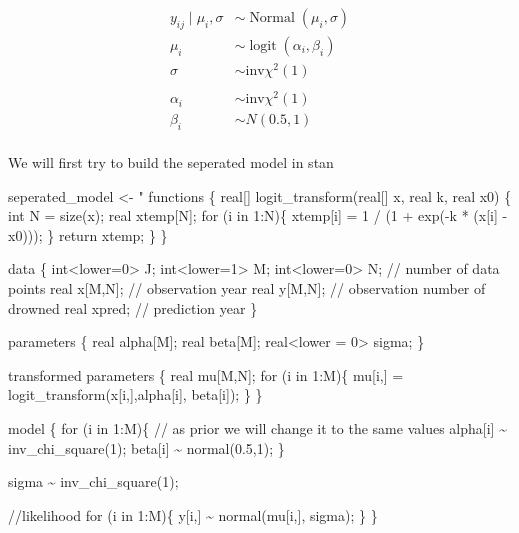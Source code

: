 \documentclass[
]{article}
\newenvironment{Shaded}{\begin{snugshade}}{\end{snugshade}}
\newcommand{\NormalTok}[1]{#1}
\newcommand{\OtherTok}[1]{\textcolor[rgb]{0.56,0.35,0.01}{#1}}
\newcommand{\StringTok}[1]{\textcolor[rgb]{0.31,0.60,0.02}{#1}}
\begin{document}
\[
\begin{aligned}
y_{i j} \mid \mu_i, \sigma &\sim \operatorname{Normal}\left(\mu_i, \sigma\right) \\
\mu_i &\sim \operatorname{logit}(\alpha_i, \beta_i)\\
\sigma &\sim \text{inv}\chi^2(1)\\
\\
\alpha_i &\sim \text{inv}\chi^2(1) \\
\beta_i &\sim N(0.5,1) \\
\end{aligned}
\]

We will first try to build the seperated model in stan

\begin{Shaded}
\begin{Highlighting}[]
\NormalTok{seperated\_model }\OtherTok{\textless{}{-}} \StringTok{"}
\StringTok{functions \{}
\StringTok{  real[] logit\_transform(real[] x, real k, real x0) \{}
\StringTok{    int N = size(x);}
\StringTok{    real xtemp[N];}
\StringTok{    for (i in 1:N)\{}
\StringTok{      xtemp[i] = 1 / (1 + exp({-}k * (x[i] {-} x0)));}
\StringTok{    \}}
\StringTok{     return xtemp;}
\StringTok{  \}}
\StringTok{\}}

\StringTok{data \{}
\StringTok{    int\textless{}lower=0\textgreater{} J;}
\StringTok{    int\textless{}lower=1\textgreater{} M;}
\StringTok{    int\textless{}lower=0\textgreater{} N; // number of data points}
\StringTok{    real x[M,N]; // observation year}
\StringTok{    real y[M,N]; // observation number of drowned}
\StringTok{    real xpred;  // prediction year}
\StringTok{\}}

\StringTok{parameters \{}
\StringTok{  real alpha[M];}
\StringTok{  real beta[M];}
\StringTok{  real\textless{}lower = 0\textgreater{} sigma;}
\StringTok{\}}

\StringTok{transformed parameters \{}
\StringTok{  real mu[M,N];}
\StringTok{  for (i in 1:M)\{}
\StringTok{    mu[i,] = logit\_transform(x[i,],alpha[i], beta[i]);}
\StringTok{  \}}
\StringTok{\}}

\StringTok{model \{}
\StringTok{  for (i in 1:M)\{}
\StringTok{    // as prior we will change it to the same values}
\StringTok{    alpha[i] \textasciitilde{} inv\_chi\_square(1);}
\StringTok{    beta[i] \textasciitilde{} normal(0.5,1);}
\StringTok{  \}}

\StringTok{  sigma \textasciitilde{} inv\_chi\_square(1);}

\StringTok{  //likelihood}
\StringTok{  for (i in 1:M)\{}
\StringTok{    y[i,] \textasciitilde{} normal(mu[i,], sigma);}
\StringTok{  \}}
\StringTok{\}}


\end{Highlighting}
\end{Shaded}
\end{document}
